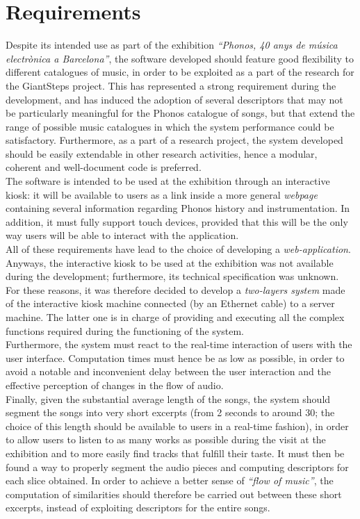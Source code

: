 \section{Requirements}
\label{sec:requirements}
Despite its intended use as part of the exhibition \textit{``Phonos, 40 anys de música electrònica a Barcelona''}, the software developed should feature good flexibility to different catalogues of music, in order to be exploited as a part of the research for the GiantSteps project. This has represented a strong requirement during the development, and has induced the adoption of several descriptors that may not be particularly meaningful for the Phonos catalogue of songs, but that extend the range of possible music catalogues in which the system performance could be satisfactory. Furthermore, as a part of a research project, the system developed should be easily extendable in other research activities, hence a modular, coherent and well-document code is preferred. \\
The software is intended to be used at the exhibition through an interactive kiosk: it will be available to users as a link inside a more general \textit{webpage} containing several information regarding Phonos history and instrumentation. In addition, it must fully support touch devices, provided that this will be the only way users will be able to interact with the application. \\ 
All of these requirements have lead to the choice of developing a \textit{web-application}. \\
Anyways, the interactive kiosk to be used at the exhibition was not available during the development; furthermore, its technical specification was unknown. For these reasons, it was therefore decided to develop a \textit{two-layers system} made of the interactive kiosk machine connected (by an Ethernet cable) to a server machine. The latter one is in charge of providing and executing all the complex functions required during the functioning of the system. \\
Furthermore, the system must react to the real-time interaction of users with the user interface. Computation times must hence be as low as possible, in order to avoid a notable and inconvenient delay between the user interaction and the effective perception of changes in the flow of audio. \\
Finally, given the substantial average length of the songs, the system should segment the songs into very short excerpts (from 2 seconds to around 30; the choice of this length should be available to users in a real-time fashion), in order to allow users to listen to as many works as possible during the visit at the exhibition and to more easily find tracks that fulfill their taste. It must then be found a way to properly segment the audio pieces and computing descriptors for each slice obtained. In order to achieve a better sense of \textit{``flow of music''}, the computation of similarities should therefore be carried out between these short excerpts, instead of exploiting descriptors for the entire songs.

